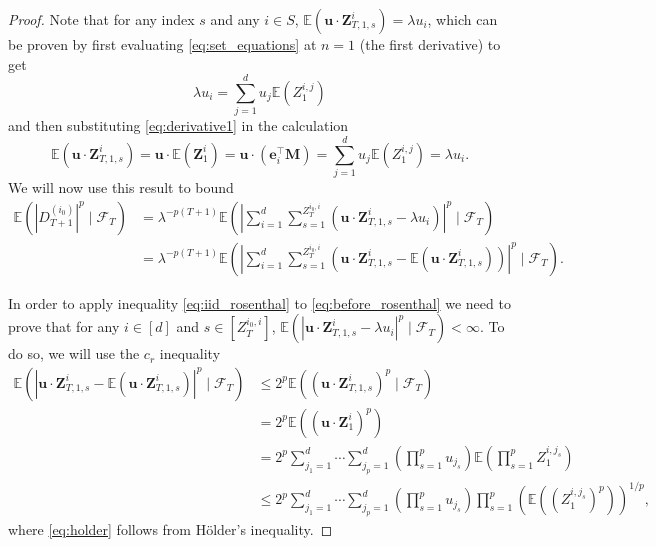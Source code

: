 \documentclass[preprint,3p,12pt]{elsarticle}
\theoremstyle{definition}
\begin{document}
\begin{proof}
Note that for any index $s$ and any $i \in S$, $\mathbb{E}( \boldsymbol{u} \cdot \boldsymbol{Z}_{T,1,s}^{i}) = \lambda u_{i}$, which can be proven by first evaluating \eqref{eq:set_equations} at $n=1$ (the first derivative) to get
\begin{equation}
    \lambda u_{i} = \sum_{j=1}^d u_j \mathbb{E}(Z_1^{i, j}) \label{eq:derivative1}
\end{equation}
and then substituting \eqref{eq:derivative1} in the calculation
\begin{equation}
     \mathbb{E}(\boldsymbol{u} \cdot \boldsymbol{Z}_{T,1,s}^i) = \boldsymbol{u} \cdot \mathbb{E}(\boldsymbol{Z}_1^i) = \boldsymbol{u} \cdot (\boldsymbol{e}_{i}^{\top} \boldsymbol{M}) = \sum_{j=1}^d u_j \mathbb{E}(Z_1^{i,j}) = \lambda u_i \label{eq:expectation_minus}.
\end{equation}
We will now use this result to bound %
\begin{align}
    \mathbb{E}(|D_{T+1}^{(i_0)}|^p\mid\mathcal{F}_{T}) %
    &=  \lambda^{-p(T+1)}\mathbb{E}\left(\left|\sum_{i=1}^d \sum_{s=1}^{Z_T^{i_0, i}} (\boldsymbol{u} \cdot \boldsymbol{Z}_{T,1,s}^{i} - \lambda u_{i})\right|^p\mid \mathcal{F}_{T}\right)\nonumber \\
    &=  \lambda^{-p(T+1)}\mathbb{E}\left(\left|\sum_{i=1}^d \sum_{s=1}^{Z_T^{i_0, i}} (\boldsymbol{u} \cdot \boldsymbol{Z}_{T,1,s}^{i} - \mathbb{E}(\boldsymbol{u} \cdot \boldsymbol{Z}_{T,1,s}^{i}))\right|^p\mid \mathcal{F}_{T}\right). \label{eq:before_rosenthal}
\end{align}

In order to apply inequality \eqref{eq:iid_rosenthal} to \eqref{eq:before_rosenthal} we need to prove that for any $i \in [d]$ and $s \in [Z_T^{i_0,i}]$, $\mathbb{E}(|\boldsymbol{u} \cdot \boldsymbol{Z}_{T,1,s}^{i} - \lambda u_{i}|^p\mid\mathcal{F}_{T}) < \infty$. To do so, we will use the $c_r$ inequality \cite[p.~157]{loeve1977}
\begin{align}
    \mathbb{E}(|\boldsymbol{u} \cdot \boldsymbol{Z}_{T,1,s}^{i} - \mathbb{E}(\boldsymbol{u} \cdot \boldsymbol{Z}_{T,1,s}^{i})|^p\mid\mathcal{F}_{T}) &\le 2^p \mathbb{E}((\boldsymbol{u} \cdot \boldsymbol{Z}_{T,1,s}^{i})^p\mid\mathcal{F}_{T}) \label{eq:binomial} \\
    &= 2^p\mathbb{E}((\boldsymbol{u} \cdot \boldsymbol{Z}_1^{i} )^p) \nonumber \\
    &= 2^p\sum_{j_1=1}^d \cdots \sum_{j_p=1}^d \left(\prod_{s=1}^p u_{j_s}\right) \mathbb{E}\left(\prod_{s=1}^p  Z_1^{i, j_s}\right) \nonumber \\
    &\le 2^p\sum_{j_1=1}^d \cdots \sum_{j_p=1}^d \left(\prod_{s=1}^p u_{j_s}\right) \prod_{s=1}^p  \left(\mathbb{E}\left(\left(Z_1^{i, j_s}\right)^p\right)\right)^{1/p}, \label{eq:holder}
    \end{align}
    where \eqref{eq:holder} follows from H\"{o}lder's inequality.
    

\end{proof}
\end{document}
